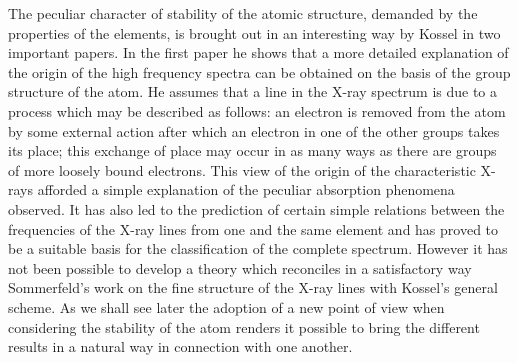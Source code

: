 The peculiar character of stability of the atomic structure, demanded
by the properties of the elements, is brought out in an
interesting way by Kossel in two important papers. In the first
paper he shows that a more detailed explanation of the origin of
the high frequency spectra can be obtained on the basis of the
group structure of the atom. He assumes that a line in the X-ray
spectrum is due to a process which may be described as follows: an
electron is removed from the atom by some external action after
which an electron in one of the other groups takes its place; this
exchange of place may occur in as many ways as there are groups
of more loosely bound electrons. This view of the origin of the
characteristic X-rays afforded a simple explanation of the peculiar
absorption phenomena observed. It has also led to the prediction
of certain simple relations between the frequencies of the X-ray
lines from one and the same element and has proved to be a suitable
basis for the classification of the complete spectrum. However it has
not been possible to develop a theory which reconciles in a satisfactory
way Sommerfeld's work on the fine structure of the X-ray
lines with Kossel's general scheme. As we shall see later the
adoption of a new point of view when considering the stability of
the atom renders it possible to bring the different results in a natural
way in connection with one another.


